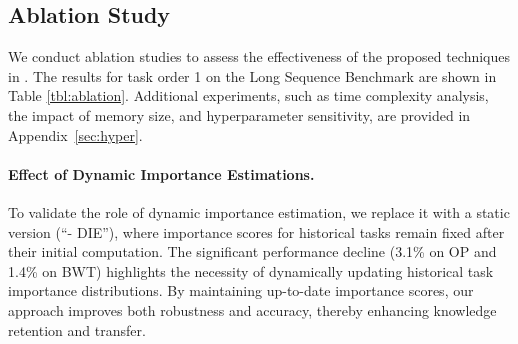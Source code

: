 \subsection{Ablation Study}
We conduct ablation studies to assess the effectiveness of the proposed techniques in {\ouralg}. The results for task order 1 on the Long Sequence Benchmark are shown in Table \ref{tbl:ablation}. Additional experiments, such as time complexity analysis, the impact of memory size, and hyperparameter sensitivity, are provided in Appendix~\ref{sec:hyper}.


\paragraph{Effect of Dynamic Importance Estimations.}  
To validate the role of dynamic importance estimation, we replace it with a static version (``- DIE''), where importance scores for historical tasks remain fixed after their initial computation.
The significant performance decline (3.1\% on OP and 1.4\% on BWT) highlights the necessity of dynamically updating historical task importance distributions. By maintaining up-to-date importance scores, our approach improves both robustness and accuracy, thereby enhancing knowledge retention and transfer.

